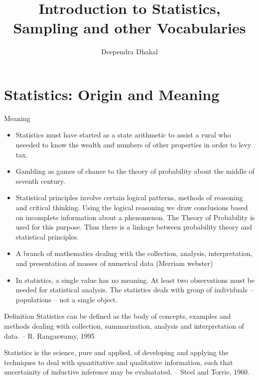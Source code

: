 \documentclass[
  ignorenonframetext,
  aspectratio=169]{beamer}
\title{Introduction to Statistics, Sampling and other Vocabularies}
\author{Deependra Dhakal}
\date{}
\institute{Assistant Professor \and Agriculture and Forestry
University \and \url{https://rookie.rbind.io}}
\providecommand{\tightlist}{%
  \setlength{\itemsep}{0pt}\setlength{\parskip}{0pt}}
\begin{document}
\frame{\titlepage}

\begin{frame}[allowframebreaks]
  \tableofcontents[hideallsubsections]
\end{frame}
\hypertarget{statistics-origin-and-meaning}{%
\section{Statistics: Origin and
Meaning}\label{statistics-origin-and-meaning}}

\begin{frame}{Meaning}
\protect\hypertarget{meaning}{}
\begin{itemize}
\tightlist
\item
  Statistics must have started as a state arithmetic to assist a rural
  who neeeded to know the wealth and numbers of other properties in
  order to levy tax.
\item
  Gambling as games of chance to the theory of probability about the
  middle of seventh century.
\item
  Statistical principles involve certain logical patterns, methods of
  reasoning and critical thinking. Using the logical reasoning we draw
  conclusions based on incomplete information about a phenomenon. The
  Theory of Probability is used for this purpose. Thus there is a
  linkage between probability theory and statistical principles.
\item
  A branch of mathematics dealing with the collection, analysis,
  interpretation, and presentation of masses of numerical data (Merriam
  webster)
\item
  In statistics, a single value has no meaning. At least two
  observations must be needed for statistical analysis. The statistics
  deals with group of individuals -- populations -- not a single object.
\end{itemize}
\end{frame}

\begin{frame}{}
\protect\hypertarget{section}{}
\begin{block}{Definition}
Statistics can be defined as the body of concepts, examples and methods dealing with collection, summarization, analysis and interpretation of data. -- R. Rangaswamy, 1995


Statistics is the science, pure and applied, of developing and applying the techniques to deal with quantitative and qualitative information, such that uncertainity of inductive inference may be evaluatated. -- Steel and Torrie, 1960.
\end{block}
\end{frame}
\end{document}
